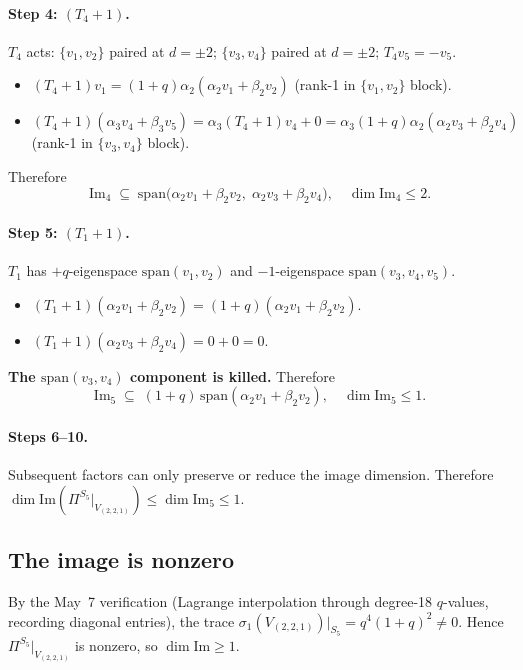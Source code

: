 \documentclass[11pt]{article}
\theoremstyle{definition}
\begin{document}
\paragraph{Step 4: $(T_4{+}1)$.}
$T_4$ acts: $\{v_1, v_2\}$ paired at $d=\pm 2$;
$\{v_3, v_4\}$ paired at $d=\pm 2$;
$T_4 v_5 = -v_5$.
\begin{itemize}[topsep=0.3em,itemsep=0.2em,leftmargin=2em]
\item $(T_4{+}1) v_1 = (1{+}q)\alpha_2 (\alpha_2 v_1 + \beta_2 v_2)$
(rank-1 in $\{v_1, v_2\}$ block).
\item $(T_4{+}1)(\alpha_3 v_4 + \beta_3 v_5) =
\alpha_3 (T_4{+}1) v_4 + 0
= \alpha_3 (1{+}q)\alpha_2 (\alpha_2 v_3 + \beta_2 v_4)$
(rank-1 in $\{v_3, v_4\}$ block).
\end{itemize}
Therefore
\[
\mathrm{Im}_4 \;\subseteq\;
\mathrm{span}\bigl(\alpha_2 v_1 + \beta_2 v_2,\;
                   \alpha_2 v_3 + \beta_2 v_4\bigr),
\quad \dim \mathrm{Im}_4 \leq 2.
\]

\paragraph{Step 5: $(T_1{+}1)$.}
$T_1$ has $+q$-eigenspace $\mathrm{span}(v_1, v_2)$ and
$-1$-eigenspace $\mathrm{span}(v_3, v_4, v_5)$.
\begin{itemize}[topsep=0.3em,itemsep=0.2em,leftmargin=2em]
\item $(T_1{+}1)(\alpha_2 v_1 + \beta_2 v_2)
= (1{+}q)(\alpha_2 v_1 + \beta_2 v_2)$.
\item $(T_1{+}1)(\alpha_2 v_3 + \beta_2 v_4) = 0 + 0 = 0$.
\end{itemize}
\textbf{The $\mathrm{span}(v_3, v_4)$ component is killed.}
Therefore
\[
\mathrm{Im}_5 \;\subseteq\; (1{+}q)\,\mathrm{span}(\alpha_2 v_1 + \beta_2 v_2),
\quad \dim \mathrm{Im}_5 \leq 1.
\]

\paragraph{Steps 6--10.} Subsequent factors can only preserve or
reduce the image dimension. Therefore
$\dim \mathrm{Im}(\Pi^{S_5}|_{V_{(2,2,1)}}) \leq \dim \mathrm{Im}_5 \leq 1$.

\subsection{The image is nonzero}

By the May~7 verification (Lagrange interpolation through degree-18
$q$-values, recording diagonal entries), the trace
$\sigma_1(V_{(2,2,1)})|_{S_5} = q^4(1+q)^2 \neq 0$. Hence
$\Pi^{S_5}|_{V_{(2,2,1)}}$ is nonzero, so $\dim \mathrm{Im} \geq 1$.
\end{document}
